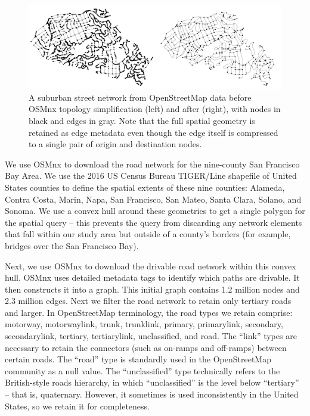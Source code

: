 \begin{figure}[ht]
\center
\includegraphics[width=\textwidth]
{graphics/simplification_before_after.png}
\caption{A suburban street network from OpenStreetMap data before OSMnx topology simplification (left) and after (right), with nodes in black and edges in gray. Note that the full spatial geometry is retained as edge metadata even though the edge itself is compressed to a single pair of origin and destination nodes.}
\label{fig:simplification_before_after}
\end{figure}

We use OSMnx to download the road network for the nine-county San Francisco Bay Area. We use the 2016 US Census Bureau TIGER/Line shapefile of United States counties to define the spatial extents of these nine counties: Alameda, Contra Costa, Marin, Napa, San Francisco, San Mateo, Santa Clara, Solano, and Sonoma. We use a convex hull around these geometries to get a single polygon for the spatial query – this prevents the query from discarding any network elements that fall within our study area but outside of a county's borders (for example, bridges over the San Francisco Bay).

Next, we use OSMnx to download the drivable road network within this convex hull. OSMnx uses detailed metadata tags to identify which paths are drivable. It then constructs it into a graph. This initial graph contains 1.2 million nodes and 2.3 million edges. Next we filter the road network to retain only tertiary roads and larger. In OpenStreetMap terminology, the road types we retain comprise: motorway, motorway\textunderscore link, trunk, trunk\textunderscore link, primary, primary\textunderscore link, secondary, secondary\textunderscore link, tertiary, tertiary\textunderscore link, unclassified, and road. The \enquote{link} types are necessary to retain the connectors (such as on-ramps and off-ramps) between certain roads. The \enquote{road} type is standardly used in the OpenStreetMap community as a null value. The \enquote{unclassified} type technically refers to the British-style roads hierarchy, in which \enquote{unclassified} is the level below \enquote{tertiary} – that is, quaternary. However, it sometimes is used inconsistently in the United States, so we retain it for completeness.

